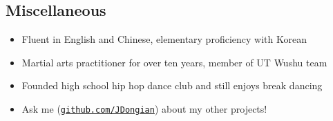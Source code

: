\documentclass[line,margin]{res}
\begin{document}
\begin{resume}
\vspace{-8pt}
\section{Miscellaneous} 
    \vspace{22pt}
        \begin{itemize} \itemsep -2pt
        \item Fluent in English and Chinese, elementary proficiency with Korean
        \item Martial arts practitioner for over ten years, member of UT Wushu team
        \item Founded high school hip hop dance club and still enjoys break dancing
        \item Ask me (\href{https://www.github.com/JDongian}{\texttt{github.com/JDongian}}) about my other projects! 
        \end{itemize}

\end{resume} 
\end{document}
